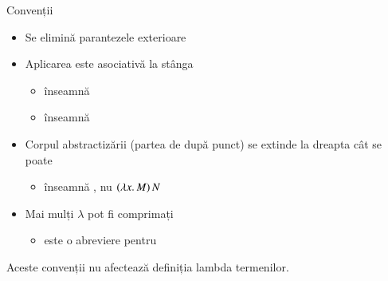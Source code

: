 \documentclass[xcolor=pdftex,romanian,colorlinks]{beamer}
\begin{document}
\begin{frame}[fragile]{ Convenții}

\begin{itemize}
\item Se elimină parantezele exterioare
\medskip
\item Aplicarea este asociativă la stânga \\
\begin{itemize}
	\item {} înseamnă \\
	\item {} înseamnă  
\end{itemize}

\medskip
\item Corpul abstractizării (partea de după punct) se extinde la dreapta cât se poate
\begin{itemize}
	\item {} înseamnă , nu {\color{red} $(\lambda x.\,M)\, N$}
\end{itemize}

\medskip
\item Mai mulți $\lambda$ pot fi comprimați
\begin{itemize}
	\item {} este o abreviere pentru 
\end{itemize}
\end{itemize}

Aceste convenții nu afectează definiția lambda termenilor.
\end{frame}

\setlength{\leftmargini}{15pt}
\end{document}
